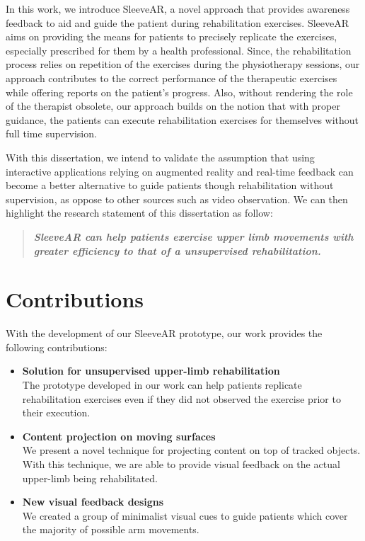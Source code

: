 In this work, we introduce SleeveAR, a novel approach that provides awareness feedback to aid and guide the patient during rehabilitation exercises.
SleeveAR aims on providing the means for patients to precisely replicate the exercises, especially prescribed for them by a health professional. 
Since, the rehabilitation process relies on repetition of the exercises during the physiotherapy sessions, our approach contributes to the correct performance of the therapeutic exercises while offering reports on the patient's progress. 
Also, without rendering the role of the therapist obsolete, our approach builds on the notion that with proper guidance, the patients can execute rehabilitation exercises for themselves without full time supervision. 

With this dissertation, we intend to validate the assumption that using interactive applications relying on augmented reality and real-time feedback can become a better alternative to guide patients though rehabilitation without supervision, as oppose to other sources such as video observation. We can then highlight the research statement of this dissertation as follow:


\begin{quotation}
\noindent \textit {\textbf { SleeveAR can help patients exercise upper limb movements with greater efficiency to that of a unsupervised rehabilitation.}}

\end{quotation}


\section{Contributions}

With the development of our SleeveAR prototype, our work provides the following contributions:

\begin{itemize}
\item \textbf{Solution for unsupervised upper-limb rehabilitation}\\
The prototype developed in our work can help patients replicate rehabilitation exercises even if they did not observed the exercise prior to their execution.

\item \textbf{Content projection on moving surfaces}\\
We present a novel technique for projecting content on top of tracked objects. With this technique, we are able to provide visual feedback on the actual upper-limb being rehabilitated.

\item \textbf{New visual feedback designs}\\
We created a group of minimalist visual cues to guide patients which cover the majority of possible arm movements.

\end{itemize}
 

